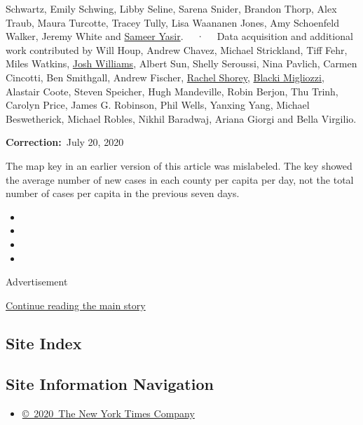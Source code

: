 Schwartz, Emily Schwing, Libby Seline, Sarena Snider, Brandon Thorp,
Alex Traub, Maura Turcotte, Tracey Tully, Lisa Waananen Jones, Amy
Schoenfeld Walker, Jeremy White and
\href{https://www.nytimes.com/by/sameer-yasir}{Sameer Yasir}. ~~·~~ Data
acquisition and additional work contributed by Will Houp, Andrew Chavez,
Michael Strickland, Tiff Fehr, Miles Watkins,
\href{https://www.nytimes.com/by/josh-williams}{Josh Williams}, Albert
Sun, Shelly Seroussi, Nina Pavlich, Carmen Cincotti, Ben Smithgall,
Andrew Fischer, \href{https://www.nytimes.com/by/rachel-shorey}{Rachel
Shorey}, \href{https://www.nytimes.com/by/blacki-migliozzi}{Blacki
Migliozzi}, Alastair Coote, Steven Speicher, Hugh Mandeville, Robin
Berjon, Thu Trinh, Carolyn Price, James G. Robinson, Phil Wells, Yanxing
Yang, Michael Beswetherick, Michael Robles, Nikhil Baradwaj, Ariana
Giorgi and Bella Virgilio.

\textbf{Correction:}~July 20, 2020

The map key in an earlier version of this article was mislabeled. The
key showed the average number of new cases in each county per capita per
day, not the total number of cases per capita in the previous seven
days.

\begin{itemize}
\item
\item
\item
\item
\end{itemize}

Advertisement

\protect\hyperlink{after-bottom}{Continue reading the main story}

\hypertarget{site-index}{%
\subsection{Site Index}\label{site-index}}

\hypertarget{site-information-navigation}{%
\subsection{Site Information
Navigation}\label{site-information-navigation}}

\begin{itemize}
\tightlist
\item
  \href{https://help.nytimes.com/hc/en-us/articles/115014792127-Copyright-notice}{©~2020~The
  New York Times Company}
\end{itemize}

